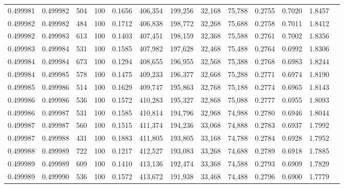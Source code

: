 \begin{tabular}{rrrrrrrrrrrrr}
0.499981 & 0.499982 &   504 & 100 &                                     0.1656 & 406,354 & 199,256 &  32,168 &  75,788 & 0.2755 & 0.7020 & 1.8457 \\
0.499982 & 0.499982 &   484 & 100 &                                     0.1712 & 406,838 & 198,772 &  32,268 &  75,688 & 0.2758 & 0.7011 & 1.8412 \\
0.499982 & 0.499983 &   613 & 100 &                                     0.1403 & 407,451 & 198,159 &  32,368 &  75,588 & 0.2761 & 0.7002 & 1.8356 \\
0.499983 & 0.499984 &   531 & 100 &                                     0.1585 & 407,982 & 197,628 &  32,468 &  75,488 & 0.2764 & 0.6992 & 1.8306 \\
0.499984 & 0.499984 &   673 & 100 &                                     0.1294 & 408,655 & 196,955 &  32,568 &  75,388 & 0.2768 & 0.6983 & 1.8244 \\
0.499984 & 0.499985 &   578 & 100 &                                     0.1475 & 409,233 & 196,377 &  32,668 &  75,288 & 0.2771 & 0.6974 & 1.8190 \\
0.499985 & 0.499986 &   514 & 100 &                                     0.1629 & 409,747 & 195,863 &  32,768 &  75,188 & 0.2774 & 0.6965 & 1.8143 \\
0.499986 & 0.499986 &   536 & 100 &                                     0.1572 & 410,283 & 195,327 &  32,868 &  75,088 & 0.2777 & 0.6955 & 1.8093 \\
0.499986 & 0.499987 &   531 & 100 &                                     0.1585 & 410,814 & 194,796 &  32,968 &  74,988 & 0.2780 & 0.6946 & 1.8044 \\
0.499987 & 0.499987 &   560 & 100 &                                     0.1515 & 411,374 & 194,236 &  33,068 &  74,888 & 0.2783 & 0.6937 & 1.7992 \\
0.499987 & 0.499988 &   431 & 100 &                                     0.1883 & 411,805 & 193,805 &  33,168 &  74,788 & 0.2784 & 0.6928 & 1.7952 \\
0.499988 & 0.499989 &   722 & 100 &                                     0.1217 & 412,527 & 193,083 &  33,268 &  74,688 & 0.2789 & 0.6918 & 1.7885 \\
0.499989 & 0.499989 &   609 & 100 &                                     0.1410 & 413,136 & 192,474 &  33,368 &  74,588 & 0.2793 & 0.6909 & 1.7829 \\
0.499989 & 0.499990 &   536 & 100 &                                     0.1572 & 413,672 & 191,938 &  33,468 &  74,488 & 0.2796 & 0.6900 & 1.7779 \\

\end{tabular}
